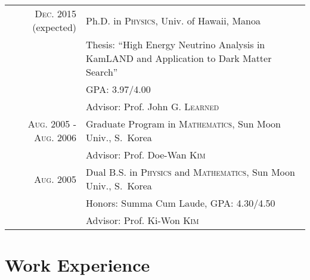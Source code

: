 \documentclass[a4paper,10pt]{article} %
\begin{document}
\begin{tabular}{rp{10.3cm}}	
	\textsc{Dec.} 2015 (expected) & Ph.D. in \textsc{Physics},
	Univ. of Hawaii, Manoa\\
	& \small Thesis: ``High Energy Neutrino Analysis in KamLAND and Application
	to Dark Matter Search''\\
	& \small GPA: 3.97/4.00\\
	& \small Advisor: Prof. John G. \textsc{Learned}\\


	\textsc{Aug.} 2005 - \textsc{Aug.} 2006 & Graduate Program in
	\textsc{Mathematics}, Sun Moon Univ., S.~Korea\\
	& \small Advisor: Prof. Doe-Wan \textsc{Kim}\\


	\textsc{Aug.} 2005 & Dual B.S. in \textsc{Physics} and
	\textsc{Mathematics}, Sun Moon Univ., S.~Korea\\
	& \small Honors: Summa Cum Laude, GPA: 4.30/4.50\\
	& \small Advisor: Prof. Ki-Won \textsc{Kim}\\


\end{tabular}


\section{Work Experience}
\end{document}
